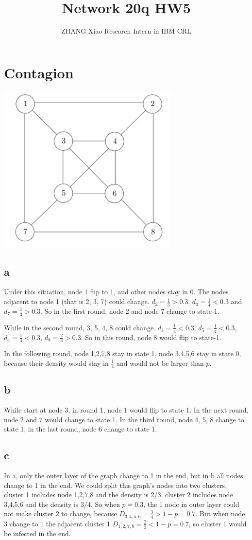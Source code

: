 \documentclass[12pt,a4paper]{article}
\author{ZHANG Xiao Research Intern in IBM CRL}
\title{Network 20q HW5	}
\begin{document}
\maketitle
\pagebreak

\section{Contagion}
\includegraphics{PIC/1.png}
\subsection{a}
Under this situation, node 1 flip to 1, and other nodes stay in 0. The nodes adjacent to node 1 (that is 2, 3, 7) could change. $d_2 = \frac{1}{3} > 0.3$, $d_3 = \frac{1}{4} < 0.3$ and $d_7 = \frac{1}{3} > 0.3$. So in the first round, node 2 and node 7 change to state-1.

While in the second round, 3, 5, 4, 8 could change.  $d_3 = \frac{1}{4} < 0.3$,  $d_5 = \frac{1}{4} < 0.3$,  $d_4 = \frac{1}{4} < 0.3$,  $d_8 = \frac{2}{3} > 0.3$.
So in this round, node 8 would flip to state-1.

In the following round, node 1,2,7,8 stay in state 1, node 3,4,5,6 stay in state 0, because their density would stay in $\frac{1}{4}$ and would not be larger than $p$.
\subsection{b}
While start at node 3, in round 1, node 1 would flip to state 1. In the next round, node 2 and 7 would change to state 1. In the third round, node 4, 5, 8 change to state 1, in the last round, node 6 change to state 1.

\subsection{c}
In a, only the outer layer of the graph change to 1  in the end, but in b all nodes change to 1 in the end. We could split this graph's nodes into two clusters, cluster 1 includes node 1,2,7,8 and the density is 2/3. cluster 2 includes node 3,4,5,6 and the density is 3/4. So when $ p=0.3 $, the 1 node in outer layer could not make cluster 2 to change, because $D_{3,4,5,6} = \frac{3}{4} > 1-p = 0.7$. But when node 3 change to 1 the adjacent cluster 1 $D_{1,2,7,8} = \frac{2}{3} < 1-p = 0.7$, so cluster 1 would be infected in the end.
\end{document}
